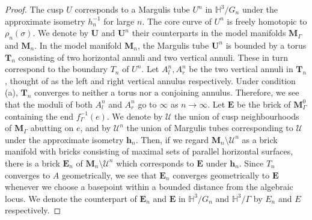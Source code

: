 \documentclass{amsart}
\theoremstyle{definition}
\newcommand\HHH{{\mathbb H}}
\begin{document}
 \begin{proof}
The cusp $U$ corresponds to a Margulis tube $U^n$ in $\HHH^3/G_n$ under the approximate isometry $h_n^{-1}$ for large $n$. The core curve of $U^n$ is freely homotopic to $\rho_n(\sigma)$.
We denote by $\mathbf U$ and $\mathbf U^n$ their counterparts in the model manifolds $\mathbf M_\Gamma$ and $\mathbf M_n$.
In the model manifold $\mathbf M_n$, the Margulis tube $\mathbf U^n$ is bounded by a torus $\mathbf T_n$ consisting of two horizontal annuli and two vertical annuli. These in turn correspond to the boundary $T_n$ of $U^n$.
Let $A_l^n, A_r^n$ be the two vertical annuli in $\mathbf T_n$, thought of as the left and right vertical annulus respectively.
Under condition (a), $\mathbf T_n$ converges to neither a torus nor a conjoining annulus.
Therefore, we see that the moduli of both $A_l^n$ and $A_r^n$ go to $\infty$ as $n \to \infty$.
Let $\mathbf E$ be the brick of $\mathbf M_\Gamma^0$ containing the end $f_\Gamma^{-1}(e)$.
We denote by $\mathcal U$ the union of cusp neighbourhoods of $\mathbf M_\Gamma$ abutting on $e$, and by $\mathcal U^n$ the union of Margulis tubes corresponding to $\mathcal U$ under the approximate isometry $\mathbf h_n$.
Then, if we regard $\mathbf M_n \setminus \mathcal U^n$ as a brick manifold with bricks consisting of maximal sets of parallel horizontal surfaces, there is a brick $\mathbf E_n$ of $\mathbf M_n \setminus \mathcal U^n$ which corresponds to $\mathbf E$ under $\mathbf h_n$.
Since $T_n$ converges to $A$ geometrically, we see that $\mathbf E_n$ converges geometrically to $\mathbf E$ whenever we choose a basepoint within a bounded distance from the algebraic locus.
We denote the counterpart of $\mathbf E_n$ and $\mathbf E$ in $\HHH^3/G_n$ and $\HHH^3/\Gamma$ by $E_n$ and $E$ respectively.
 


\end{proof}
\end{document}
